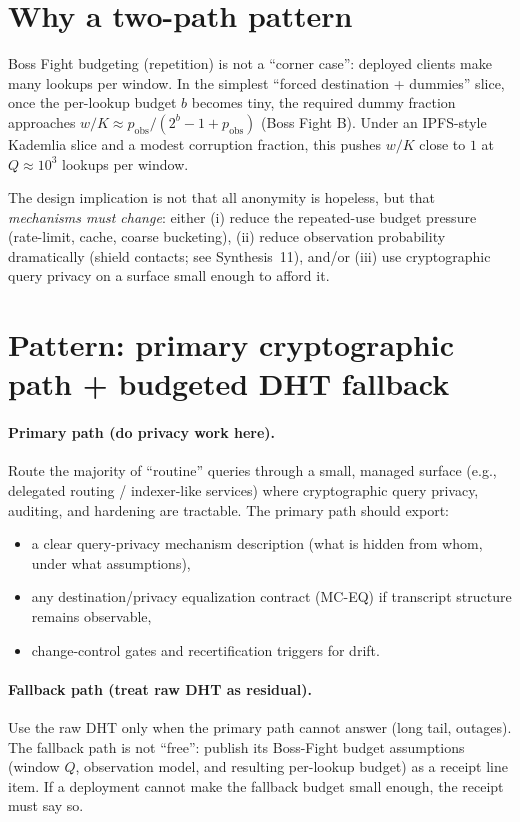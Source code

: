 \documentclass[11pt]{article}
\begin{document}
\section{Why a two-path pattern}
Boss Fight budgeting (repetition) is not a ``corner case'': deployed clients make many lookups per window.
In the simplest ``forced destination + dummies'' slice, once the per-lookup budget $b$ becomes tiny, the required dummy fraction approaches $w/K\approx p_{\mathrm{obs}}/(2^b-1+p_{\mathrm{obs}})$ (Boss Fight B).\cite{series:bossfightB}
Under an IPFS-style Kademlia slice and a modest corruption fraction, this pushes $w/K$ close to $1$ at $Q\approx 10^3$ lookups per window.\cite{series:bossfightB}

The design implication is not that all anonymity is hopeless, but that \emph{mechanisms must change}: either (i) reduce the repeated-use budget pressure (rate-limit, cache, coarse bucketing), (ii) reduce observation probability dramatically (shield contacts; see Synthesis~11), and/or (iii) use cryptographic query privacy on a surface small enough to afford it.

\section{Pattern: primary cryptographic path + budgeted DHT fallback}
\paragraph{Primary path (do privacy work here).}
Route the majority of ``routine'' queries through a small, managed surface (e.g., delegated routing / indexer-like services) where cryptographic query privacy, auditing, and hardening are tractable.
The primary path should export:
\begin{itemize}[leftmargin=1.2em]
\item a clear query-privacy mechanism description (what is hidden from whom, under what assumptions),
\item any destination/privacy equalization contract (MC-EQ) if transcript structure remains observable,\cite{series:mceq}
\item change-control gates and recertification triggers for drift.\cite{series:recert}
\end{itemize}

\paragraph{Fallback path (treat raw DHT as residual).}
Use the raw DHT only when the primary path cannot answer (long tail, outages).
The fallback path is not ``free'': publish its Boss-Fight budget assumptions (window $Q$, observation model, and resulting per-lookup budget) as a receipt line item.\cite{series:receiptitems,series:bossfightB}
If a deployment cannot make the fallback budget small enough, the receipt must say so.
\end{document}

